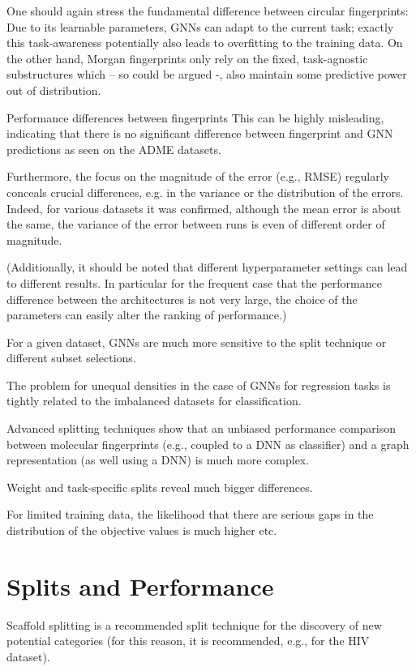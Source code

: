 One should again stress the fundamental difference between circular fingerprints: Due to its learnable parameters, GNNs can adapt to the current task; exactly this task-awareness potentially also leads to overfitting to the training data. 
On the other hand, Morgan fingerprints only rely on the fixed, task-agnostic substructures which – so could be argued -, also maintain some predictive power out of distribution.

Performance differences between fingerprints 
This can be highly misleading, indicating that there is no significant difference between fingerprint and GNN predictions as seen on the ADME datasets.

Furthermore, the focus on the magnitude of the error (e.g., RMSE) regularly conceals crucial differences, e.g. in the variance or the distribution of the errors. Indeed, for various datasets it was confirmed, although the mean error is about the same, the variance of the error between runs is even of different order of magnitude.


(Additionally, it should be noted that different hyperparameter settings can lead to different results. In particular for the frequent case that the performance difference between the architectures is not very large, the choice of the parameters can easily alter the ranking of performance.)

For a given dataset, GNNs are much more sensitive to the split technique or different subset selections.

The problem for unequal densities in the case of GNNs for regression tasks is tightly related to the imbalanced datasets for classification.


Advanced splitting techniques show that an unbiased performance comparison between molecular fingerprints (e.g., coupled to a DNN as classifier) and a graph representation (as well using a DNN) is much more complex.

Weight and task-specific splits reveal much bigger differences.

For limited training data, the likelihood that there are serious gaps in the distribution of the objective values is much higher etc.


\section{Splits and Performance}

Scaffold splitting is a recommended split technique for the discovery of new potential categories (for this reason, it is recommended, e.g., for the HIV dataset).

